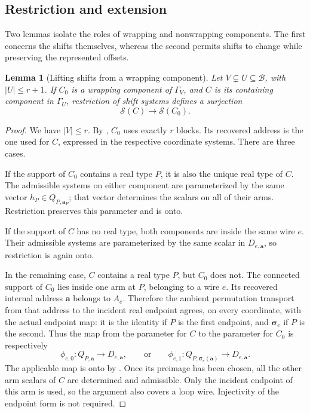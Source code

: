 \documentclass[11pt]{article}
\newtheorem{lemma}[theorem]{Lemma}
\theoremstyle{definition}
\begin{document}
\subsection{Restriction and extension}
\label{offset:restriction}

Two lemmas isolate the roles of wrapping and nonwrapping components.
The first concerns the shifts themselves, whereas the second permits
shifts to change while preserving the represented offsets.

\begin{lemma}[Lifting shifts from a wrapping component]
\label{offset:lem-wrapping-lift}
Let \(V\subsetneq U\subseteq\mathcal B\), with \(\left\lvert{U}\right\rvert\le r+1\).
If \(C_0\) is a wrapping component of \(\Gamma_V\), and \(C\) is its
containing component in \(\Gamma_U\), restriction of shift systems defines
a surjection
\[
    \mathcal S(C)\longrightarrow\mathcal S(C_0).
\]
\end{lemma}

\begin{proof}
We have \(\left\lvert{V}\right\rvert\le r\). By , \(C_0\) uses
exactly \(r\) blocks. Its recovered address is the one used for \(C\),
expressed in the respective coordinate systems. There are three cases.

If the support of \(C_0\) contains a real type \(P\), it is also the
unique real type of \(C\). The admissible systems on either component
are parameterized by the same vector \(h_P\in Q_{P,\mathbf a_P}\);
that vector determines the scalars on all of their arms. Restriction
preserves this parameter and is onto.

If the support of \(C\) has no real type, both components are inside the
same wire \(e\). Their admissible systems are parameterized by the same
scalar in \(D_{e,\mathbf a}\), so restriction is again onto.

In the remaining case, \(C\) contains a real type \(P\), but \(C_0\) does
not. The connected support of \(C_0\) lies inside one arm at \(P\),
belonging to a wire \(e\). Its recovered internal address
\(\mathbf a\) belongs to \(A_e\). Therefore the ambient permutation
transport from that address to the incident real endpoint agrees, on
every coordinate, with the actual endpoint map: it is the identity if
\(P\) is the first endpoint, and \(\boldsymbol\sigma_e\) if \(P\) is the
second. Thus the map from the parameter for \(C\) to the parameter for
\(C_0\) is respectively
\[
 \phi_{e,0}:Q_{P,\mathbf a}\longrightarrow D_{e,\mathbf a},
 \qquad\text{or}\qquad
 \phi_{e,1}:Q_{P,\boldsymbol\sigma_e(\mathbf a)}
                    \longrightarrow D_{e,\mathbf a}.
\]
The applicable map is onto by .
Once its preimage has been chosen, all the other arm scalars of \(C\)
are determined and admissible. Only the incident endpoint of this arm
is used, so the argument also covers a loop wire. Injectivity of the
endpoint form is not required.
\end{proof}
\end{document}

